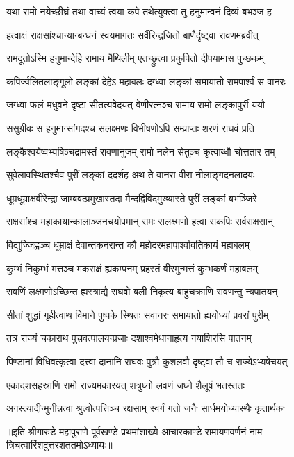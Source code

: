 \twolineshloka
{यथा रामो नयेच्छीघ्रं तथा वाच्यं त्वया कपे}
{तथेत्युक्त्वा तु हनुमान्वनं दिव्यं बभञ्ज ह} %

\twolineshloka
{हत्वाक्षं राक्षसांश्चान्यान्बन्धनं स्वयमागतः}
{सर्वैरिन्द्रजितो बाणैर्दृष्ट्वा रावणमब्रवीत्} %

\twolineshloka
{रामदूतोऽस्मि हनुमान्देहि रामाय मैथिलीम्}
{एतच्छ्रुत्वा प्रकुपितो दीपयामास पुच्छकम्} %

\twolineshloka
{कपिर्ज्वलितलाङ्गूलो लङ्कां देहेऽ महाबलः}
{दग्ध्वा लङ्कां समायातो रामपार्श्वं स वानरः} %

\twolineshloka
{जग्ध्वा फलं मधुवने दृष्टा सीतत्यवेदयत्}
{वेणीरत्नञ्च रामाय रामो लङ्कापुर्री ययौ} %

\twolineshloka
{ससुग्रीवः स हनुमान्सांगदश्च सलक्ष्मणः}
{विभीषणोऽपि सम्प्राप्तः शरणं राघवं प्रति} %

\twolineshloka
{लङ्कैश्वर्येष्वभ्यषिञ्चद्रामस्तं रावणानुजम्}
{रामो नलेन सेतुञ्च कृत्वाब्धौ चोत्ततार तम्} %

\twolineshloka
{सुवेलावस्थितश्चैव पुरीं लङ्कां ददर्शह}
{अथ ते वानरा वीरा नीलाङ्गदनलादयः} %

\twolineshloka
{धूम्रधूम्राक्षवीरेन्द्रा जाम्बवत्प्रमुखास्तदा}
{मैन्दद्विविदमुख्यास्ते पुरीं लङ्कां बभञ्जिरे} %

\twolineshloka
{राक्षसांश्च महाकायान्कालाञ्जनचयोपमान्}
{रामः सलक्ष्मणो हत्वा सकपिः सर्वराक्षसान्} %

\twolineshloka
{विद्युज्जिह्वञ्च धूम्राक्षं देवान्तकनरान्त कौ}
{महोदरमहापार्श्वावतिकायं महाबलम्} %

\twolineshloka
{कुम्भं निकुम्भं मत्तञ्च मकराक्षं ह्यकम्पनम्}
{प्रहस्तं वीरमुन्मत्तं कुम्भकर्णं महाबलम्} %

\twolineshloka
{रावणिं लक्ष्मणोऽच्छिन्त ह्यस्त्राद्यै राघवो बली}
{निकृत्य बाहुचक्राणि रावणन्तु न्यपातयन्} %

\twolineshloka
{सीतां शुद्धां गृहीत्वाथ विमाने पुष्पके स्थितः}
{सवानरः समायातो ह्ययोध्यां प्रवरां पुरीम्} %

\twolineshloka
{तत्र राज्यं चकाराथ पुत्त्रवत्पालयन्प्रजाः}
{दशाश्वमेधानाहृत्य गयाशिरसि पातनम्} %

\twolineshloka
{पिण्डानां विधिवत्कृत्वा दत्त्वा दानानि राघवः}
{पुत्रौ कुशलवौ दृष्ट्वा तौ च राज्येऽभ्यषेचयत्} %

\twolineshloka
{एकादशसहस्राणि रामो राज्यमकारयत्}
{शत्रुघ्नो लवणं जघ्ने शैलूषं भतस्ततः} %

\twolineshloka
{अगस्त्यादीन्मुनीन्नत्वा श्रुत्वोत्पत्तिञ्च रक्षसाम्}
{स्वर्गं गतो जनैः सार्धमयोध्यास्थैः कृतार्थकः} %

॥इति श्रीगारुडे महापुराणे पूर्वखण्डे प्रथमांशाख्ये आचारकाण्डे रामायणवर्णनं नाम
त्रिचत्वारिंशदुत्तरशततमोऽध्यायः॥